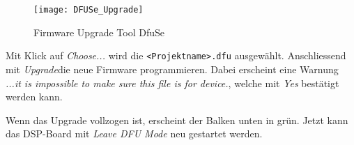 \begin{figure}[H]
	\centering
	\texttt{[image: DFUSe\_Upgrade]}
	\caption{Firmware Upgrade Tool DfuSe}
	\label{pic:DFUSe_Upgrade}
\end{figure}

Mit Klick auf \textit{\glqq Choose...\grqq} wird die \texttt{<Projektname>.dfu} ausgewählt.
Anschliessend mit \glqq\textit{Upgrade}\grqq die neue Firmware programmieren.
Dabei erscheint eine Warnung \textit{\glqq ...it is impossible to make sure this file is for device.\grqq}, welche mit \textit{\glqq Yes\grqq} bestätigt werden kann.

Wenn das Upgrade vollzogen ist, erscheint der Balken unten in grün. Jetzt kann das DSP-Board mit \textit{\glqq Leave DFU Mode\grqq} neu gestartet werden.


